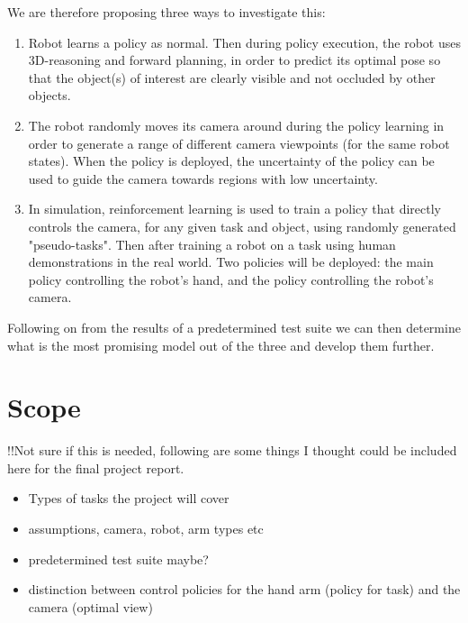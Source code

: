     We are therefore proposing three ways to investigate this:
    \begin{enumerate}
      \item Robot learns a policy as normal. Then during policy execution, the robot uses 3D-reasoning and forward planning, in order to predict its optimal pose so that the object(s) of interest are clearly visible and not occluded by other objects.
      \item The robot randomly moves its camera around during the policy learning in order to generate a range of different camera viewpoints (for the same robot states). When the policy is deployed, the uncertainty of the policy  can be used to guide the camera towards regions with low uncertainty.
      \item In simulation, reinforcement learning is used to train a policy that directly controls the camera, for any given task and object, using randomly generated "pseudo-tasks". Then after training a robot on a task using human demonstrations in the real world. Two policies will be deployed: the main policy controlling the robot's hand, and the policy controlling the robot's camera.
\end{enumerate}

Following on from the results of a predetermined test suite we can then determine what is the most promising model out of the three and develop them further.
\section{Scope}
!!Not sure if this is needed, following are some things I thought could be included here for the final project report.

\begin{itemize}
	\item Types of tasks the project will cover
	\item assumptions, camera, robot, arm types etc
	\item predetermined test suite maybe?
	\item distinction between control policies for the hand arm (policy for task) and the camera (optimal view)
\end{itemize}


